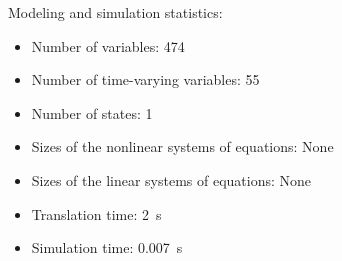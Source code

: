 \begin{contextbox}
  Modeling and simulation statistics:
  \begin{itemize}
    \item Number of variables: 474
    \item Number of time-varying variables: 55
    \item Number of states: 1
    \item Sizes of the nonlinear systems of equations: None
    \item Sizes of the linear systems of equations: None
    \item Translation time: \SI{2}{s}
    \item Simulation time: \SI{0.007}{s}
  \end{itemize}
\end{contextbox}